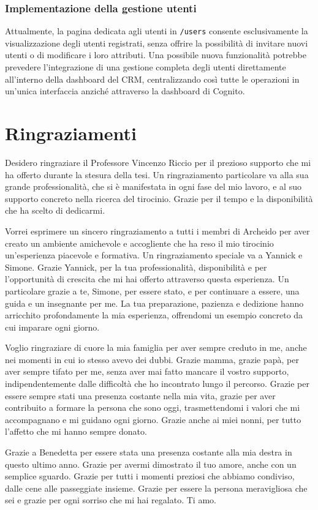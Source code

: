 \documentclass[target=bach,aauheader=,style=]{thud}
\begin{document}
\subsection{Implementazione della gestione utenti}
Attualmente, la pagina dedicata agli utenti in \texttt{/users} consente esclusivamente la visualizzazione degli utenti registrati, senza offrire la possibilità di invitare nuovi utenti o di modificare i loro attributi. Una possibile nuova funzionalità potrebbe prevedere l'integrazione di una gestione completa degli utenti direttamente all'interno della dashboard del CRM, centralizzando così tutte le operazioni in un'unica interfaccia anziché attraverso la dashboard di Cognito.


\chapter{Ringraziamenti}
Desidero ringraziare il Professore Vincenzo Riccio per il prezioso supporto che mi ha offerto durante la stesura della tesi.  Un ringraziamento particolare va alla sua grande professionalità, che si è manifestata in ogni fase del mio lavoro, e al suo supporto concreto nella ricerca del tirocinio. Grazie per il tempo e la disponibilità che ha scelto di dedicarmi.
\par
\vspace{20pt}
\noindent Vorrei esprimere un sincero ringraziamento a tutti i membri di Archeido per aver creato un ambiente amichevole e accogliente che ha reso il mio tirocinio un'esperienza piacevole e formativa. Un ringraziamento speciale va a Yannick e Simone. Grazie Yannick, per la tua professionalità, disponibilità e per l'opportunità di crescita che mi hai offerto attraverso questa esperienza. Un particolare grazie a te, Simone, per essere stato, e per continuare a essere, una guida e un insegnante per me. La tua preparazione, pazienza e dedizione hanno arricchito profondamente la mia esperienza, offrendomi un esempio concreto da cui imparare ogni giorno.
\par
\vspace{20pt}
\noindent Voglio ringraziare di cuore la mia famiglia per aver sempre creduto in me, anche nei momenti in cui io stesso avevo dei dubbi. Grazie mamma, grazie papà, per aver sempre tifato per me, senza aver mai fatto mancare il vostro supporto, indipendentemente dalle difficoltà che ho incontrato lungo il percorso. Grazie per essere sempre stati una presenza costante nella mia vita, grazie per aver contribuito a formare la persona che sono oggi, trasmettendomi i valori che mi accompagnano e mi guidano ogni giorno. Grazie anche ai miei nonni, per tutto l'affetto che mi hanno sempre donato.
\par
\vspace{20pt}
\noindent Grazie a Benedetta per essere stata una presenza costante alla mia destra in questo ultimo anno. Grazie per avermi dimostrato il tuo amore, anche con un semplice sguardo. Grazie per tutti i momenti preziosi che abbiamo condiviso, dalle cene alle passeggiate insieme. Grazie per essere la persona meravigliosa che sei e grazie per ogni sorriso che mi hai regalato. Ti amo.
\end{document}
